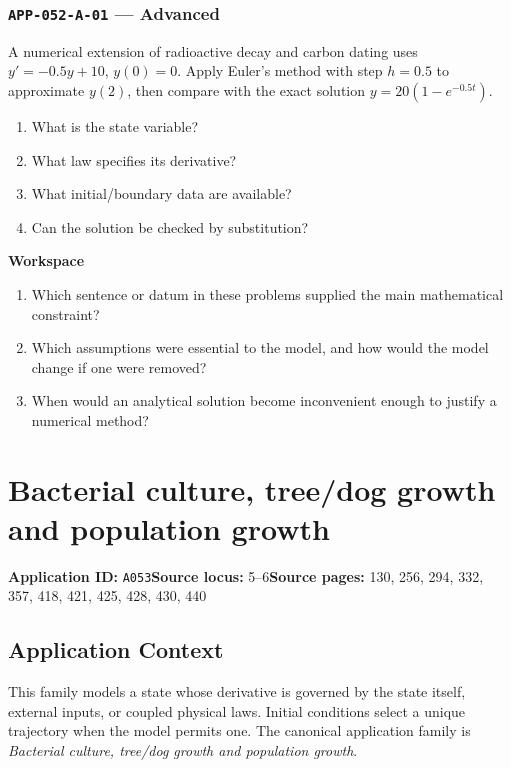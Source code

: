 \documentclass[11pt]{book}
\newcommand{\pid}[1]{\texttt{#1}}
\newcommand{\workspace}{\par\vspace{0.7in}\hrulefill\par\vspace{0.55in}\hrulefill\par}
\begin{document}
\subsection*{\pid{APP-052-A-01} — Advanced}
\begin{problembox}
A numerical extension of radioactive decay and carbon dating uses $y'=-0.5y+10$, $y(0)=0$. Apply Euler's method with step $h=0.5$ to approximate $y(2)$, then compare with the exact solution $y=20(1-e^{-0.5t})$.
\end{problembox}
\begin{promptbox}\begin{enumerate}
\item What is the state variable?
\item What law specifies its derivative?
\item What initial/boundary data are available?
\item Can the solution be checked by substitution?
\end{enumerate}\end{promptbox}
\textbf{Workspace}\workspace
\begin{reflectionbox}\begin{enumerate}
\item Which sentence or datum in these problems supplied the main mathematical constraint?
\item Which assumptions were essential to the model, and how would the model change if one were removed?
\item When would an analytical solution become inconvenient enough to justify a numerical method?
\end{enumerate}\end{reflectionbox}
\chapter{Bacterial culture, tree/dog growth and population growth}\label{app:A053}
\textbf{Application ID:} \pid{A053}\quad \textbf{Source locus:} 5–6\quad \textbf{Source pages:} 130, 256, 294, 332, 357, 418, 421, 425, 428, 430, 440
\section*{Application Context}
This family models a state whose derivative is governed by the state itself, external inputs, or coupled physical laws. Initial conditions select a unique trajectory when the model permits one. The canonical application family is \emph{Bacterial culture, tree/dog growth and population growth}.
\end{document}
